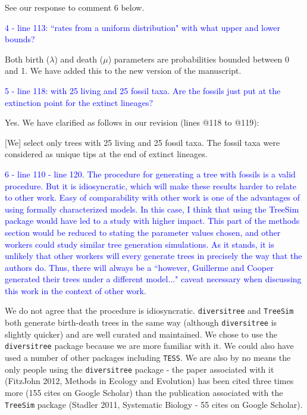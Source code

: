 \documentclass[11pt]{letter}
\begin{document}
\begin{letter}{}
See our response to comment 6 below.


\textcolor{blue}{4 - line 113: ``rates from a uniform distribution" with what upper and lower bounds?}

Both birth ($\lambda$) and death ($\mu$) parameters are probabilities bounded between 0 and 1. We have added this to the new version of the manuscript.


\textcolor{blue}{5 - line 118: with 25 living and 25 fossil taxa. Are the fossils just put at the extinction point for the extinct lineages?}

Yes. We have clarified as follows in our revision (lines @118 to @119):

\hfill\begin{minipage}{\dimexpr\textwidth-1cm}
[We] select only trees with 25 living and 25 fossil taxa. The fossil taxa were considered as unique tips at the end of extinct lineages.
\end{minipage}


\textcolor{blue}{6 - line 110 - line 120. The procedure for generating a tree with fossils is a valid procedure. But it is idiosyncratic, which will make these results harder to relate to other work. Easy of comparability with other work is one of the advantages of using formally characterized models. In this case, I think that using the TreeSim package would have led to a study with higher impact. This part of the methods section would be reduced to stating the parameter values chosen, and other workers could study similar tree generation simulations. As it stands, it is unlikely that other workers will every generate trees in precisely the way that the authors do. Thus, there will always be a ``however, Guillerme and Cooper generated their trees under a different model..." caveat necessary when discussing this work in the context of other work.}

We do not agree that the procedure is idiosyncratic. \texttt{diversitree} and \texttt{TreeSim} both generate birth-death trees in the same way (although \texttt{diversitree} is slightly quicker) and are well curated and maintained. We chose to use the \texttt{diversitree} package because we are more familiar with it. We could also have used a number of other packages including \texttt{TESS}. We are also by no means the only people using the \texttt{diversitree} package - the paper associated with it (FitzJohn 2012, Methods in Ecology and Evolution) has been cited three times more (155 cites on Google Scholar) than the publication associated with the \texttt{TreeSim} package (Stadler 2011, Systematic Biology - 55 cites on Google Scholar).


\end{letter}
\end{document}

